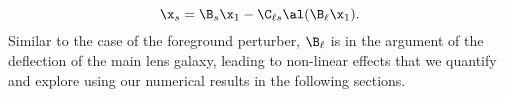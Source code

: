 \begin{equation}
\x_s = \B_s \x_1 - \C_{\ell s} \al(\B_\ell \x_1).
\end{equation}
Similar to the case of the foreground perturber, $\B_\ell$ is in the argument of the deflection of the main lens galaxy, leading to non-linear effects that we quantify and explore using our numerical results in the following sections.
  